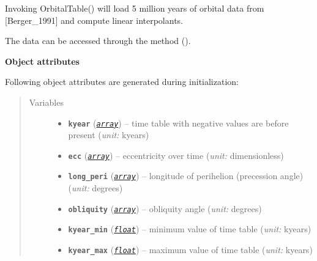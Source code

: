 \documentclass[a4paper,10pt,english]{sphinxmanual}
\begin{document}
\begin{fulllineitems}
\label{api/climlab.solar:climlab.solar.orbital.OrbitalTable}
Invoking OrbitalTable() will load 5 million years of orbital data
from {[}Berger\_1991{]} and compute linear interpolants.

The data can be accessed through the method {\hyperref[api/climlab.solar:climlab.solar.orbital.OrbitalTable.lookup_parameters]{\emph{}}} ().

\textbf{Object attributes}

Following object attributes are generated during initialization:
\begin{quote}\begin{description}
\item[{Variables}] \leavevmode\begin{itemize}
\item {} 
\textbf{\texttt{kyear}} (\href{http://docs.python.org/2.7/library/array.html\#module-array}{\emph{\texttt{array}}}) -- time table with negative values are before present 
(\emph{unit:} kyears)

\item {} 
\textbf{\texttt{ecc}} (\href{http://docs.python.org/2.7/library/array.html\#module-array}{\emph{\texttt{array}}}) -- eccentricity over time (\emph{unit:} dimensionless)

\item {} 
\textbf{\texttt{long\_peri}} (\href{http://docs.python.org/2.7/library/array.html\#module-array}{\emph{\texttt{array}}}) -- longitude of perihelion (precession angle) (\emph{unit:} degrees)

\item {} 
\textbf{\texttt{obliquity}} (\href{http://docs.python.org/2.7/library/array.html\#module-array}{\emph{\texttt{array}}}) -- obliquity angle (\emph{unit:} degrees)

\item {} 
\textbf{\texttt{kyear\_min}} (\href{http://docs.python.org/2.7/library/functions.html\#float}{\emph{\texttt{float}}}) -- minimum value of time table (\emph{unit:} kyears)

\item {} 
\textbf{\texttt{kyear\_max}} (\href{http://docs.python.org/2.7/library/functions.html\#float}{\emph{\texttt{float}}}) -- maximum value of time table (\emph{unit:} kyears)


\end{itemize}
\end{description}
\end{quote}
\end{fulllineitems}
\end{document}
